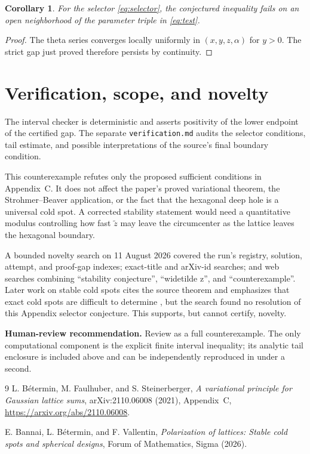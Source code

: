 \documentclass[11pt]{article}
\newtheorem{corollary}{Corollary}
\begin{document}
\begin{corollary}
For the selector \eqref{eq:selector}, the conjectured inequality fails on an
open neighborhood of the parameter triple in \eqref{eq:test}.
\end{corollary}
\begin{proof}
The theta series converges locally uniformly in $(x,y,z,\alpha)$ for $y>0$.
The strict gap just proved therefore persists by continuity.
\end{proof}

\section{Verification, scope, and novelty}

The interval checker is deterministic and asserts positivity of the lower
endpoint of the certified gap.  The separate \texttt{verification.md} audits
the selector conditions, tail estimate, and possible interpretations of the
source's final boundary condition.

This counterexample refutes only the proposed sufficient conditions in
Appendix~C.  It does not affect the paper's proved variational theorem, the
Strohmer--Beaver application, or the fact that the hexagonal deep hole is a
universal cold spot.  A corrected stability statement would need a quantitative
modulus controlling how fast $\widetilde z$ may leave the circumcenter as the
lattice leaves the hexagonal boundary.

A bounded novelty search on 11 August 2026 covered the run's registry,
solution, attempt, and proof-gap indexes; exact-title and arXiv-id searches;
and web searches combining ``stability conjecture'', ``widetilde z'', and
``counterexample''.  Later work on stable cold spots cites the source theorem
and emphasizes that exact cold spots are difficult to determine
\cite{BDV}, but the search found no resolution of this Appendix selector
conjecture.  This supports, but cannot certify, novelty.

\textbf{Human-review recommendation.}  Review as a full counterexample.  The
only computational component is the explicit finite interval inequality; its
analytic tail enclosure is included above and can be independently reproduced
in under a second.

\begin{thebibliography}{9}
L. B\'etermin, M. Faulhuber, and S. Steinerberger,
\emph{A variational principle for Gaussian lattice sums},
arXiv:2110.06008 (2021), Appendix~C,
\url{https://arxiv.org/abs/2110.06008}.

E. Bannai, L. B\'etermin, and F. Vallentin,
\emph{Polarization of lattices: Stable cold spots and spherical designs},
Forum of Mathematics, Sigma (2026).
\end{thebibliography}
\end{document}
